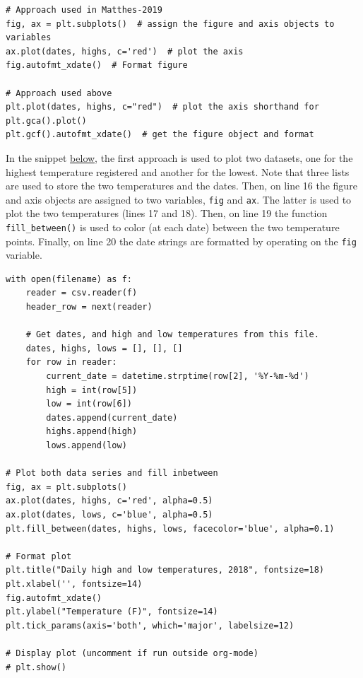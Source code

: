 \documentclass[10pt]{book}
\begin{document}
\label{orgb9ca12b}
\begin{verbatim}
# Approach used in Matthes-2019
fig, ax = plt.subplots()  # assign the figure and axis objects to variables
ax.plot(dates, highs, c='red')  # plot the axis
fig.autofmt_xdate()  # Format figure

# Approach used above
plt.plot(dates, highs, c="red")  # plot the axis shorthand for plt.gca().plot()
plt.gcf().autofmt_xdate()  # get the figure object and format
\end{verbatim}

In the snippet \hyperref[orgd88b94b]{below}, the first approach is used to plot two datasets, one for the highest temperature registered and another for the lowest. Note that three lists are used to store the two temperatures and the dates. Then, on line 16 the figure and axis objects are assigned to two variables, \texttt{fig} and \texttt{ax}. The latter is used to plot the two temperatures (lines 17 and 18). Then,  on line 19 the function \texttt{fill\_between()} is used to color (at each date) between the two temperature points. Finally, on line 20 the date strings are formatted by operating on the \texttt{fig} variable.

\label{orgd88b94b}
\begin{verbatim}
with open(filename) as f:
    reader = csv.reader(f)
    header_row = next(reader)

    # Get dates, and high and low temperatures from this file.
    dates, highs, lows = [], [], []
    for row in reader:
        current_date = datetime.strptime(row[2], '%Y-%m-%d')
        high = int(row[5])
        low = int(row[6])
        dates.append(current_date)
        highs.append(high)
        lows.append(low)

# Plot both data series and fill inbetween
fig, ax = plt.subplots()
ax.plot(dates, highs, c='red', alpha=0.5)
ax.plot(dates, lows, c='blue', alpha=0.5)
plt.fill_between(dates, highs, lows, facecolor='blue', alpha=0.1)

# Format plot
plt.title("Daily high and low temperatures, 2018", fontsize=18)
plt.xlabel('', fontsize=14)
fig.autofmt_xdate()
plt.ylabel("Temperature (F)", fontsize=14)
plt.tick_params(axis='both', which='major', labelsize=12)

# Display plot (uncomment if run outside org-mode)
# plt.show()
\end{verbatim}
\end{document}
